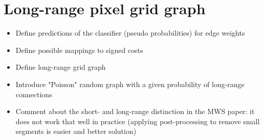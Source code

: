 
\section{Long-range pixel grid graph}
\begin{itemize}
\item Define predictions of the classifier (pseudo probabilities) for edge weights
\item Define possible mappings to signed costs
\item Define long-range grid graph
\item Introduce "Poisson" random graph with a given probability of long-range connections
\item Comment about the short- and long-range distinction in the MWS paper: it does not work that well in practice (applying post-processing to remove small segments is easier and better solution)
\end{itemize}
